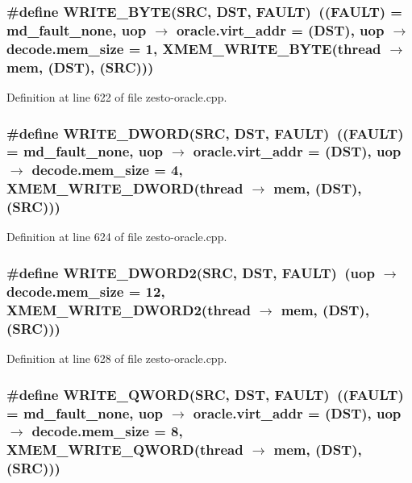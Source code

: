 \subsubsection[{WRITE\_\-BYTE}]{\setlength{\rightskip}{0pt plus 5cm}\#define WRITE\_\-BYTE(SRC, \/  DST, \/  FAULT)~((FAULT) = md\_\-fault\_\-none, uop $\rightarrow$ oracle.virt\_\-addr = (DST), uop $\rightarrow$ decode.mem\_\-size = 1, XMEM\_\-WRITE\_\-BYTE(thread $\rightarrow$ mem, (DST), (SRC)))}\label{zesto-oracle_8cpp_fc76adbab625381a0c38c41c059ca331}




Definition at line 622 of file zesto-oracle.cpp.
\subsubsection[{WRITE\_\-DWORD}]{\setlength{\rightskip}{0pt plus 5cm}\#define WRITE\_\-DWORD(SRC, \/  DST, \/  FAULT)~((FAULT) = md\_\-fault\_\-none, uop $\rightarrow$ oracle.virt\_\-addr = (DST), uop $\rightarrow$ decode.mem\_\-size = 4, XMEM\_\-WRITE\_\-DWORD(thread $\rightarrow$ mem, (DST), (SRC)))}\label{zesto-oracle_8cpp_76efb0aae9cc59d15bad44bbdeca75d5}




Definition at line 624 of file zesto-oracle.cpp.
\subsubsection[{WRITE\_\-DWORD2}]{\setlength{\rightskip}{0pt plus 5cm}\#define WRITE\_\-DWORD2(SRC, \/  DST, \/  FAULT)~(uop $\rightarrow$ decode.mem\_\-size = 12, XMEM\_\-WRITE\_\-DWORD2(thread $\rightarrow$ mem, (DST), (SRC)))}\label{zesto-oracle_8cpp_5d75212fc6c9f2094fabfe9c7cbe8e35}




Definition at line 628 of file zesto-oracle.cpp.
\subsubsection[{WRITE\_\-QWORD}]{\setlength{\rightskip}{0pt plus 5cm}\#define WRITE\_\-QWORD(SRC, \/  DST, \/  FAULT)~((FAULT) = md\_\-fault\_\-none, uop $\rightarrow$ oracle.virt\_\-addr = (DST), uop $\rightarrow$ decode.mem\_\-size = 8, XMEM\_\-WRITE\_\-QWORD(thread $\rightarrow$ mem, (DST), (SRC)))}\label{zesto-oracle_8cpp_973ac8efc8287f3aebe50e8cf1aef741}




